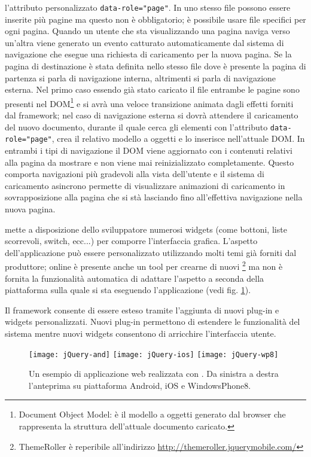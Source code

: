			l'attributo personalizzato \verb|data-role="page"|.	In uno stesso
			file \html{} possono essere inserite più pagine ma questo non è
			obbligatorio; è possibile usare file \html{} specifici per ogni pagina.
			Quando un utente che sta visualizzando una pagina naviga verso
			un'altra viene generato un evento catturato automaticamente dal
			sistema di navigazione \ajax{} che esegue una richiesta di caricamento
			per la nuova pagina. Se la pagina di destinazione è stata definita
			nello stesso file dove è presente la pagina di partenza si parla di
			navigazione interna, altrimenti si parla di navigazione esterna. Nel
			primo caso essendo già stato caricato il file \html{} entrambe le
			pagine sono presenti nel DOM\footnote{Document Object Model: è il
			modello a oggetti \js{} generato dal browser che rappresenta la
			struttura dell'attuale documento \html{} caricato.} e si avrà una
			veloce transizione animata dagli effetti forniti dal framework;
			nel caso di navigazione esterna si dovrà attendere il caricamento
			del nuovo documento, durante il quale \jqm{} cerca gli
			elementi \html{} con l'attributo \verb|data-role="page"|, crea il
			relativo modello a oggetti e lo inserisce nell'attuale DOM.	In
			entrambi i tipi di navigazione il DOM viene aggiornato con i
			contenuti relativi alla pagina da mostrare e non viene mai
			reinizializzato completamente. Questo comporta navigazioni più
			gradevoli alla vista dell'utente e il sistema di caricamento
			asincrono permette di visualizzare animazioni di caricamento in
			sovrapposizione alla pagina che si stà lasciando fino all'effettiva
			navigazione nella nuova pagina.
			
			\jqm{} mette a disposizione dello sviluppatore numerosi
			widgets (come bottoni, liste scorrevoli, switch, ecc...) per
			comporre l'interfaccia grafica. L'aspetto dell'applicazione può
			essere personalizzato utilizzando molti temi già forniti dal
			produttore; online è presente anche un tool per crearne di nuovi
			\footnote{ThemeRoller è reperibile all'indirizzo
			\url{http://themeroller.jquerymobile.com/}} ma non è fornita la
			funzionalità automatica di adattare l'aspetto a seconda della
			piattaforma sulla quale si sta eseguendo l'applicazione (vedi fig.
			\ref{fig:jquery}).
			
			Il framework consente di essere esteso tramite l'aggiunta di nuovi
			plug-in e widgets personalizzati. Nuovi plug-in permettono di
			estendere le funzionalità del sistema mentre nuovi widgets
			consentono di arricchire l'interfaccia utente.
			\begin{figure}[h]
				\centering
				\texttt{[image: jQuery-and]}
				\texttt{[image: jQuery-ios]}
				\texttt{[image: jQuery-wp8]}
				\caption{
					Un esempio di applicazione web realizzata con \jqm{}.
					Da sinistra a destra l'anteprima su piattaforma Android, iOS
					e WindowsPhone8.
				}
				\label{fig:jquery}
			\end{figure}
	
